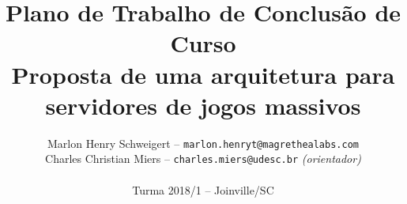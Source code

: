 \documentclass[11pt]{article}
\begin{document}
\pagestyle{fancy}

\title{
Plano de Trabalho de Conclusão de Curso\\
Proposta de uma arquitetura para servidores de jogos massivos
}

\author{
Marlon Henry Schweigert -- \texttt{marlon.henryt@magrethealabs.com}\\
Charles Christian Miers -- \texttt{charles.miers@udesc.br} {\it (orientador)}\\
~\\
Turma 2018/1 -- Joinville/SC
}
\end{document}
